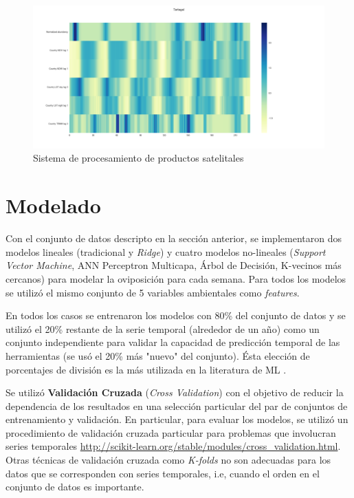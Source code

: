     \begin{figure}
    \centering%
    \includegraphics[width=1\textwidth]{images/heatmap}%
    \caption{Sistema de procesamiento de productos satelitales}\label{fig:heatmap}
    \end{figure}



\section{Modelado}

  \par Con el conjunto de datos descripto en la sección anterior, se implementaron
    dos modelos lineales (tradicional y \textit{Ridge}) y cuatro modelos
    no-lineales (\textit{Support Vector Machine}, ANN Perceptron Multicapa,
    Árbol de Decisión, K-vecinos más cercanos) para modelar la oviposición
    para cada semana. Para todos los modelos se utilizó el mismo conjunto de
    5 variables ambientales como \textit{features}.

  \par En todos los casos se entrenaron los modelos con 80\% del conjunto de
    datos y se utilizó el 20\% restante de la serie temporal (alrededor de un año)
    como un conjunto independiente para validar la capacidad de predicción temporal
    de las herramientas (se usó el 20\% más "nuevo" del conjunto). Ésta elección
    de porcentajes de división es la más utilizada en la literatura de ML \cite{ml_rainfall}.

  \par Se utilizó \textbf{Validación Cruzada}
    (\textit{Cross Validation}) \cite{cross_validation, ml_rainfall} con el
    objetivo de reducir la dependencia de los resultados en una selección particular
    del par de conjuntos de entrenamiento y validación. En particular, para
    evaluar los modelos, se utilizó un procedimiento de validación cruzada
    particular para problemas que involucran series temporales
    \url{http://scikit-learn.org/stable/modules/cross_validation.html}.
    Otras técnicas de validación cruzada como \textit{K-folds} no son
    adecuadas para los datos que se corresponden con series temporales, i.e,
    cuando el orden en el conjunto de datos es importante.

